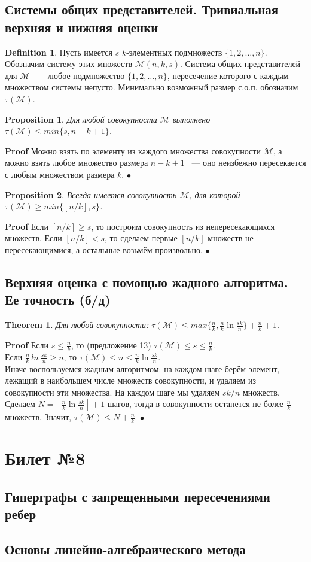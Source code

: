 \documentclass[a4paper]{article}
\theoremstyle{plain}
\newtheorem{theorem}{Theorem}
\newtheorem*{proposition-star}{Proposition}
\theoremstyle{remark}
\theoremstyle{definition}
\newtheorem*{definition-star}{Definition}
\renewenvironment{proof}{{\bfseries Proof}}{$\bullet$}
\newcommand{\class}[1]{\left[ #1 \right]}
\newcommand{\myM}{\mathcal{M}}
\begin{document}
\subsection{Системы общих представителей. Тривиальная верхняя и нижняя оценки}
\begin{definition-star} Пусть имеется $s$ $k$-элементных подмножеств $\{1,2,\dots,n\}$. Обозначим систему этих множеств $\myM(n,k,s)$. Система общих представителей для $\myM$ ~--- любое подмножество $\{1,2,\dots,n\}$, пересечение которого с каждым множеством системы непусто. Минимально возможный размер с.о.п. обозначим $\tau(\myM)$.
\end{definition-star}
\begin{proposition-star} Для любой совокупности $\myM$ выполнено $\tau(\myM)\leq min\{s,n-k+1\}$.
\end{proposition-star}
\begin{proof} Можно взять по элементу из каждого множества совокупности $\myM$, а можно взять любое множество размера $n-k+1$ ~--- оно неизбежно пересекается с любым множеством размера $k$.
\end{proof}
\begin{proposition-star} Всегда имеется совокупность $\myM$, для которой $\tau(\myM)\geq min\{[n/k],s\}$.
\end{proposition-star}
\begin{proof} Если $[n/k]\geq s$, то построим совокупность из непересекающихся множеств. Если $[n/k]<s$, то сделаем первые $[n/k]$ множеств не пересекающимися, а остальные возьмём произвольно.
\end{proof}
\subsection{Верхняя оценка с помощью жадного алгоритма. Ее точность (б/д)}
\begin{theorem} Для любой совокупности: $\tau(\myM)\leq max\{\frac{n}{k},\frac{n}{k}\ln \frac{sk}{n}\}+\frac{n}{k}+1$.
\end{theorem}
\begin{proof} Если $s\leq \frac{n}{k}$, то (предложение 13) $\tau(\myM)\leq s\leq \frac{n}{k}$.\\
Если $\frac{n}{k}\,ln\:\frac{sk}{n}\geq n$, то $\tau(\myM)\leq n \leq \frac{n}{k}\ln \frac{sk}{n}$.\\
Иначе воспользуемся жадным алгоритмом: на каждом шаге берём элемент, лежащий в наибольшем числе множеств совокупности, и удаляем из совокупности эти множества. На каждом шаге мы удаляем $sk/n$ множеств. Сделаем $N = \class{\frac{n}{k}\ln \frac{sk}{n}}+1$ шагов, тогда в совокупности останется не более $\frac{n}{k}$ множеств. Значит, $\tau(\myM)\leq N+\frac{n}{k}$.
\end{proof}

\section{Билет №8}
\subsection{Гиперграфы с запрещенными пересечениями ребер}
\subsection{Основы линейно-алгебраического метода}
\end{document}
